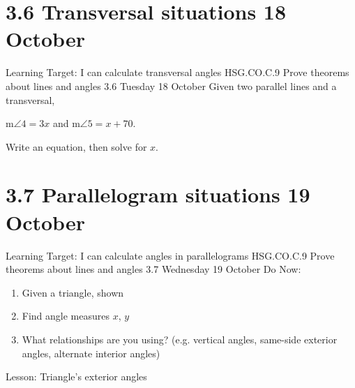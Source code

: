 \section{3.6 Transversal situations \hfill 18 October}
\begin{frame}{Learning Target: I can calculate transversal angles}
  {HSG.CO.C.9 Prove theorems about lines and angles  \hfill \alert{3.6 Tuesday 18 October}}
  Given two parallel lines and a transversal, \par \smallskip
    m$\angle 4 = 3x$ and m$\angle 5 = x + 70$. \par \smallskip 
    Write an equation, then solve for $x$.
  \begin{flushright}
  \end{flushright}
\end{frame}

\section{3.7 Parallelogram situations \hfill 19 October}
\begin{frame}{Learning Target: I can calculate angles in parallelograms}
  {HSG.CO.C.9 Prove theorems about lines and angles  \hfill \alert{3.7 Wednesday 19 October}}
  Do Now: 
  \begin{multicols}{2}
    \begin{enumerate}
      \item Given a triangle, shown
      \item Find angle measures $x$, $y$
      \item What relationships are you using? (e.g. vertical angles, same-side exterior angles, alternate interior angles)
    \end{enumerate}
  \end{multicols}
  Lesson: Triangle's exterior angles
\end{frame}

